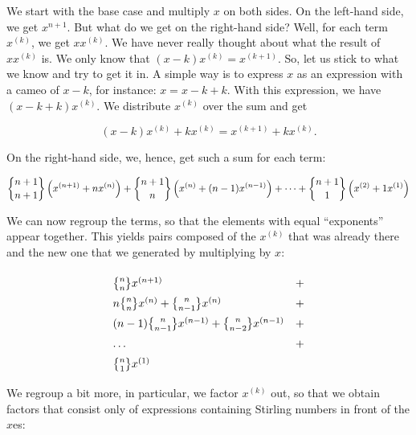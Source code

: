 \documentclass[tikz]{scrreprt}
\begin{document}
We start with the base case and multiply $x$ on both sides.
On the left-hand side, we get $x^{n+1}$. But what do we get
on the right-hand side?
Well, for each term $x^{(k)}$, we get $xx^{(k)}$.
We have never really thought about what the result of $xx^{(k)}$ is.
We only know that $(x-k)x^{(k)} = x^{(k+1)}$.
So, let us stick to what we know and try to get it in.
A simple way is to express $x$ as an expression with a cameo of $x-k$,
for instance: $x = x-k+k$.
With this expression, we have $(x-k+k)x^{(k)}$.
We distribute $x^{(k)}$ over the sum and get

\[
(x-k)x^{(k)} + kx^{(k)} = x^{(k+1)} + kx^{(k)}.
\]

On the right-hand side, we, hence, get such a sum for each term:

\[
\stirlingTwo{n+1}{n+1}\left(x^{(n+1)} + nx^{(n)}\right) + 
\stirlingTwo{n+1}{n}\left(x^{(n)} + (n-1)x^{(n-1)}\right) + \dots + 
\stirlingTwo{n+1}{1}\left(x^{(2)} + 1 x^{(1)}\right)
\]

We can now regroup the terms, so that the elements with equal
``exponents'' appear together. This yields pairs composed
of the $x^{(k)}$ that was already there and the new one
that we generated by multiplying by $x$:

\[
\begingroup
\renewcommand{\arraystretch}{1.5}
\begin{array}{lc}
\stirlingTwo{n}{n}x^{(n+1)} & + \\
n\stirlingTwo{n}{n}x^{(n)}  + 
\stirlingTwo{n}{n-1}x^{(n)} & + \\
(n-1)\stirlingTwo{n}{n-1}x^{(n-1)} + 
\stirlingTwo{n}{n-2}x^{(n-1)} & + \\
\dots & + \\
\stirlingTwo{n}{1}x^{(1)} &
\end{array}
\endgroup
\]


We regroup a bit more, in particular, we
factor $x^{(k)}$ out, so that we obtain
factors that consist only of expressions containing
Stirling numbers in front of the $x$es:
\end{document}
